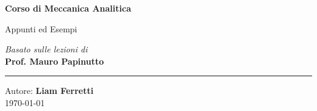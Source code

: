 \documentclass[11pt, a4paper, openright]{book}
\theoremstyle{plain}
\theoremstyle{definition}
\theoremstyle{remark}
\begin{document}
\begin{titlepage}
    \centering
    \vspace*{4cm}

    \Huge
    \textbf{Corso di Meccanica Analitica}

    \vspace{0.5cm}
    \LARGE
    Appunti ed Esempi

    \vspace{1.5cm}

    \textit{Basato sulle lezioni di} \\
    \Large \textbf{Prof. Mauro Papinutto}

    \vfill

    \rule{\linewidth}{0.5pt}
    \vspace{0.5cm}

    \large
    Autore: \textbf{Liam Ferretti} \\
    \today

\end{titlepage}

\tableofcontents
\end{document}

